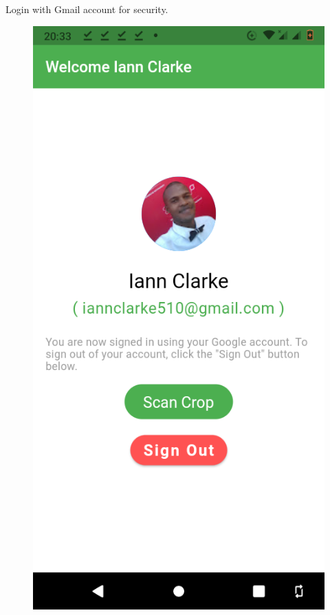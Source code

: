 \documentclass[11pt]{report}
\begin{document}
Login with Gmail account for security.\\
\begin{figure}[h]
	\centerline{\small 
		\includegraphics[height=0.25\textheight]  {home}}
\end{figure}
\end{document}
